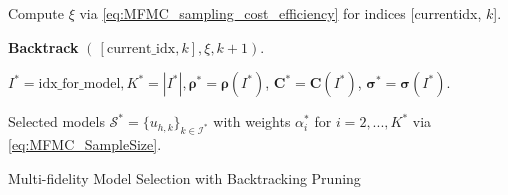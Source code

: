 \begin{algorithm}[!ht]
{{{     %

     

        
        Compute $\xi$ via \eqref{eq:MFMC_sampling_cost_efficiency} for indices  
      [current\textunderscore idx, $k$].

      
      \textbf{Backtrack} $(\, [\text{current}\_\text{idx},k],\xi, k+1)$.
  }
}
}
\vspace{3mm} 


 
$I^* = \text{idx}\_\text{for}\_\text{model}, K^* = |I^*|, \boldsymbol{\rho}^* = \boldsymbol{\rho} (I^*)$, $\boldsymbol{C}^* = \boldsymbol{C} (I^*)$, $\boldsymbol{\sigma}^* = \boldsymbol{\sigma} (I^*)$.

Selected models $\mathcal{S}^* = \{u_{h,k}\}_{k\in \mathcal{I^*}}$ with weights $\alpha_i^*$ for $i=2,...,K^*$ via \eqref{eq:MFMC_SampleSize}.




\caption{Multi-fidelity Model Selection with Backtracking Pruning}
\end{algorithm}
\ULforem




